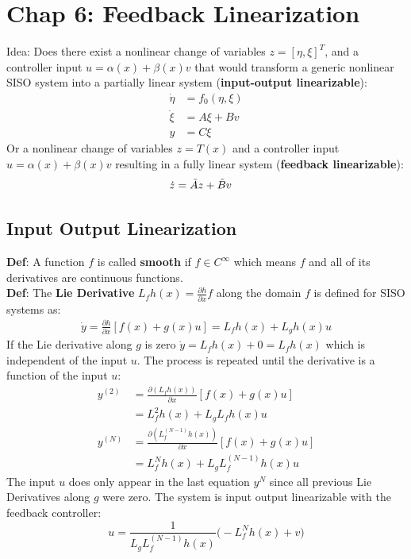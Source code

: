 \section{Chap 6: Feedback Linearization}
Idea: Does there exist a nonlinear change of variables $z = {[\eta,\xi]}^T$, and a controller input $u = \alpha(x) + \beta(x)v$ that would transform a generic nonlinear SISO system into a partially linear system (\textbf{input-output linearizable}):
\begin{align*}
    \Dot{\eta} & = f_0(\eta,\xi) \\
    \Dot{\xi}  & = A\xi + Bv     \\
    y          & = C\xi
\end{align*}
Or a nonlinear change of variables $z = T(x)$ and a controller input $u = \alpha(x) + \beta(x)v$ resulting in a fully linear system (\textbf{feedback linearizable}):
\begin{align*}
    \Dot{z} & = \Tilde{A}z + \Tilde{B}v
\end{align*}
\subsection{Input Output Linearization}
\textbf{Def}: A function $f$ is called \textbf{smooth} if $f\in C^\infty$ which means $f$ and all of its derivatives are continuous functions.\\
\textbf{Def}: The \textbf{Lie Derivative} $L_f h(x) = \frac{\partial h}{\partial x}f$ along the domain $f$ is defined for SISO systems as:
\begin{align*}
    \Dot{y} = \frac{\partial h}{\partial x} [f(x) + g(x)u] = L_f h(x) + L_g h(x)u
\end{align*}
If the Lie derivative along $g$ is zero $\Dot{y} = L_f h(x) + 0 = L_f h(x)$ which is independent of the input $u$. The process is repeated until the derivative is a function of the input $u$:
\begin{align*}
    y^{(2)} & = \frac{\partial (L_f h(x))}{\partial x}[f(x) + g(x)u]         \\
            & = L_f^2 h(x) + L_g L_f h(x) u                                  \\
    y^{(N)} & = \frac{\partial (L_f^{(N-1)} h(x))}{\partial x}[f(x) + g(x)u] \\
            & = L_f^N h(x) + L_g L_f^{(N-1)} h(x) u
\end{align*}
The input $u$ does only appear in the last equation $y^{N}$ since all previous Lie Derivatives along $g$ were zero. The system is input output linearizable with the feedback controller:
\noindent\begin{equation*}
    \boxed{u = \frac{1}{L_g L_f^{(N-1)}h(x)} \Big(-L_f^N h(x) + v \Big)}
\end{equation*}

